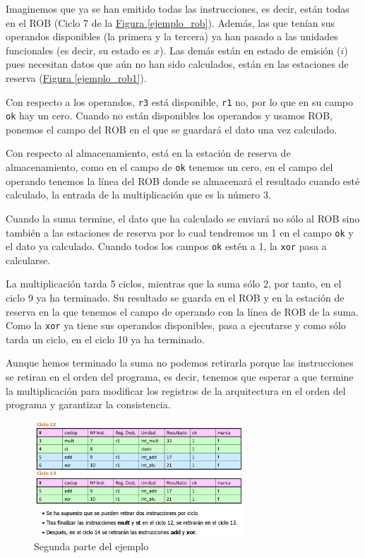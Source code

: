 \documentclass[10pt,a4paper,spanish]{report}
\begin{document}
Imaginemos que ya se han emitido todas las instrucciones, es decir, están todas en el ROB (Ciclo 7 de la \hyperref[ejemplo_rob]{Figura \ref*{ejemplo_rob}}). Además, las que tenían sus operandos disponibles (la primera y la tercera) ya han pasado a las unidades funcionales (es decir, su estado es $x$). Las demás están en estado de emisión ($i$) pues necesitan datos que aún no han sido calculados, están en las estaciones de reserva (\hyperref[ejemplo_rob1]{Figura \ref*{ejemplo_rob1}}).

Con respecto a los operandos, \verb*|r3| está disponible, \verb*|r1| no, por lo que en su campo \verb*|ok| hay un cero. Cuando no están disponibles los operandos y usamos ROB, ponemos el campo del ROB en el que se guardará el dato una vez calculado.

Con respecto al almacenamiento, está en la estación de reserva de almacenamiento, como en el campo de \verb*|ok| tenemos un cero, en el campo del operando tenemos la línea del ROB donde se almacenará el resultado cuando esté calculado, la entrada de la multiplicación que es la número 3.

Cuando la suma termine, el dato que ha calculado se enviará no sólo al ROB sino también a las estaciones de reserva por lo cual tendremos un 1 en el campo \verb*|ok| y el dato ya calculado. Cuando todos los campos \verb*|ok| estén a 1, la \verb*|xor| pasa a calcularse.

La multiplicación tarda 5 ciclos, mientras que la suma sólo 2, por tanto, en el ciclo 9 ya ha terminado. Su resultado se guarda en el ROB y en la estación de reserva en la que tenemos el campo de operando con la línea de ROB de la suma. Como la \verb*|xor| ya tiene sus operandos disponibles, pasa a ejecutarse y como sólo tarda un ciclo, en el ciclo 10 ya ha terminado.

Aunque hemos terminado la suma no podemos retirarla porque las instrucciones se retiran en el orden del programa, es decir, tenemos que esperar a que termine la multiplicación para modificar los registros de la arquitectura en el orden del programa y garantizar la consistencia.

\begin{figure}[!h]
\centering
\includegraphics[width=0.7\textwidth]{103}
\caption{Segunda parte del ejemplo}
\label{ejemplo_rob2}
\end{figure}
\end{document}
